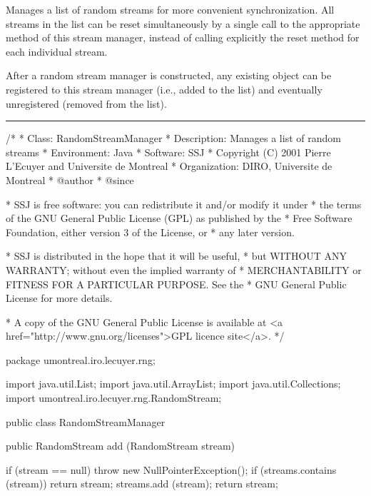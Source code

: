 
Manages a list of random streams for more convenient synchronization.
All streams in the list can be reset simultaneously by a single 
call to the appropriate method of this stream manager,
instead of calling explicitly the reset method for each 
individual stream.

After a random stream manager is constructed, any
existing  object can be registered
to this stream manager (i.e., added to the list)
and eventually unregistered (removed from the list).

\bigskip\hrule

\begin{code}
\begin{hide}
/*
 * Class:        RandomStreamManager
 * Description:  Manages a list of random streams
 * Environment:  Java
 * Software:     SSJ 
 * Copyright (C) 2001  Pierre L'Ecuyer and Universite de Montreal
 * Organization: DIRO, Universite de Montreal
 * @author       
 * @since

 * SSJ is free software: you can redistribute it and/or modify it under
 * the terms of the GNU General Public License (GPL) as published by the
 * Free Software Foundation, either version 3 of the License, or
 * any later version.

 * SSJ is distributed in the hope that it will be useful,
 * but WITHOUT ANY WARRANTY; without even the implied warranty of
 * MERCHANTABILITY or FITNESS FOR A PARTICULAR PURPOSE.  See the
 * GNU General Public License for more details.

 * A copy of the GNU General Public License is available at
   <a href="http://www.gnu.org/licenses">GPL licence site</a>.
 */
\end{hide}
package umontreal.iro.lecuyer.rng;\begin{hide}

import java.util.List;
import java.util.ArrayList;
import java.util.Collections;
import umontreal.iro.lecuyer.rng.RandomStream;
\end{hide}

public class RandomStreamManager\begin{hide} {
   private List streams = new ArrayList();
\end{hide}

   public RandomStream add (RandomStream stream)\begin{hide} {
      if (stream == null)
         throw new NullPointerException();
      if (streams.contains (stream))
         return stream;
      streams.add (stream);
      return stream;
   }\end{hide}
\end{code}
